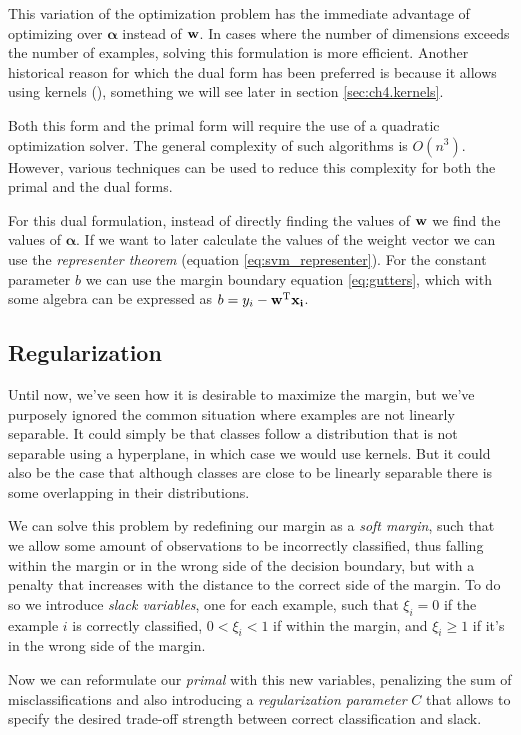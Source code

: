 This variation of the optimization problem has the immediate advantage of op\-ti\-miz\-ing over $\boldsymbol{\alpha}$ instead of $\mathbf{w}$. In cases where the number of dimensions exceeds the number of examples, solving this formulation is more efficient. Another historical reason for which the dual form has been preferred is because it allows using kernels (\cite{chapelle_training_2007}), something we will see later in section \ref{sec:ch4.kernels}.

Both this form and the primal form will require the use of a quadratic op\-ti\-miza\-tion solver. The general complexity of such algorithms is $O(n^3)$. However, various techniques can be used to reduce this complexity for both the primal and the dual forms.

For this dual formulation, instead of directly finding the values of $\mathbf{w}$ we find the values of $\boldsymbol{\alpha}$. If we want to later calculate the values of the weight vector we can use the \emph{representer theorem} (equation \ref{eq:svm_representer}). For the constant parameter $b$ we can use the margin boundary equation \ref{eq:gutters}, which with some algebra can be expressed as $b = y_i - \mathbf{w^{\text{T}}}\mathbf{x_i}$.

\subsection{Regularization}

Until now, we've seen how it is desirable to maximize the margin, but we've pur\-pose\-ly ignored the common situation where examples are not linearly separable. It could simply be that classes follow a distribution that is not separable using a hyperplane, in which case we would use kernels. But it could also be the case that although classes are close to be linearly separable there is some overlapping in their distributions.  

We can solve this problem by redefining our margin as a \emph{soft margin}, such that we allow some amount of observations to be incorrectly classified, thus falling within the margin or in the wrong side of the decision boundary, but with a penalty that increases with the distance to the correct side of the margin. To do so we introduce \emph{slack variables}, one for each example, such that $\xi_i = 0$ if the example $i$ is correctly classified, $0 < \xi_i < 1$ if within the margin, and $\xi_i \ge 1$ if it's in the wrong side of the margin.

Now we can reformulate our \emph{primal} with this new variables, penalizing the sum of misclassifications and also introducing a \emph{regularization parameter} $C$ that allows to specify the desired trade-off strength between correct classification and slack.

